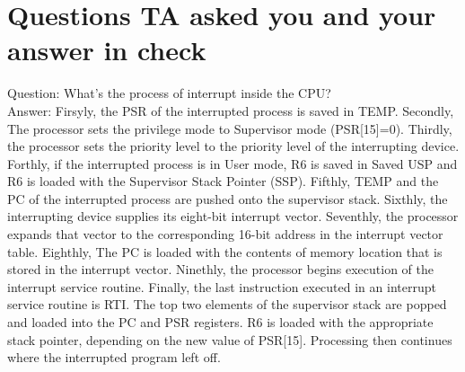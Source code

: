 \documentclass[a4paper, 12pt]{article}
\begin{document}
\section{Questions TA asked you and your answer in check}

\begin{spacing}{0.8}
\noindent
Question: What's the process of interrupt inside the CPU?\\
Answer: Firsyly, the PSR of the interrupted process is saved in TEMP. Secondly, The processor sets the privilege mode to Supervisor mode (PSR[15]=0). Thirdly, the processor sets the priority level to the priority level of the
interrupting device. Forthly, if the interrupted process is in User mode, R6 is saved in Saved USP and R6 is loaded with the Supervisor Stack Pointer (SSP). Fifthly, TEMP and the PC of the interrupted process are pushed onto the supervisor stack. Sixthly, the interrupting device supplies its eight-bit interrupt vector. Seventhly, the processor expands that vector to the corresponding 16-bit address in the interrupt vector table. Eighthly, The PC is loaded with the contents of memory location that is stored in the interrupt vector. Ninethly, the processor begins execution of the interrupt service routine. Finally, the last instruction executed in an interrupt service routine is RTI. The top two elements of the supervisor stack are popped and loaded into the PC and PSR registers. R6 is loaded with the appropriate stack pointer, depending on the new value of PSR[15]. Processing then continues where the interrupted program left off.
\end{spacing}
\end{document}

